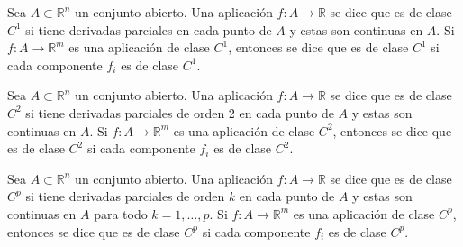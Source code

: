 \begin{definición}[Clase $C^1$]
    Sea $A \subset \mathbb{R}^n$ un conjunto abierto. Una aplicación $f: A \to \mathbb{R}$ se dice que es de clase $C^1$ si tiene derivadas parciales en cada punto de $A$ y estas son continuas en $A$. Si $f: A \to \mathbb{R}^m$ es una aplicación de clase $C^1$, entonces se dice que es de clase $C^1$ si cada componente $f_i$ es de clase $C^1$.
\end{definición}

\begin{definición}[Clase $C^2$]
    Sea $A \subset \mathbb{R}^n$ un conjunto abierto. Una aplicación $f: A \to \mathbb{R}$ se dice que es de clase $C^2$ si tiene derivadas parciales de orden 2 en cada punto de $A$ y estas son continuas en $A$. Si $f: A \to \mathbb{R}^m$ es una aplicación de clase $C^2$, entonces se dice que es de clase $C^2$ si cada componente $f_i$ es de clase $C^2$.
\end{definición}

\begin{definición}[Clase $C^p$]
    Sea $A \subset \mathbb{R}^n$ un conjunto abierto. Una aplicación $f: A \to \mathbb{R}$ se dice que es de clase $C^p$ si tiene derivadas parciales de orden $k$ en cada punto de $A$ y estas son continuas en $A$ para todo $k = 1, \ldots, p$. Si $f: A \to \mathbb{R}^m$ es una aplicación de clase $C^p$, entonces se dice que es de clase $C^p$ si cada componente $f_i$ es de clase $C^p$.
\end{definición}

